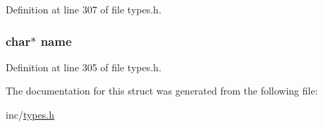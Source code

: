 Definition at line 307 of file types.h.

\hypertarget{structproperty_t_a5ac083a645d964373f022d03df4849c8}{
\subsubsection[{name}]{\setlength{\rightskip}{0pt plus 5cm}char$\ast$ {\bf name}}}
\label{structproperty_t_a5ac083a645d964373f022d03df4849c8}


Definition at line 305 of file types.h.



The documentation for this struct was generated from the following file:\begin{DoxyCompactItemize}
\item 
inc/\hyperlink{types_8h}{types.h}\end{DoxyCompactItemize}

